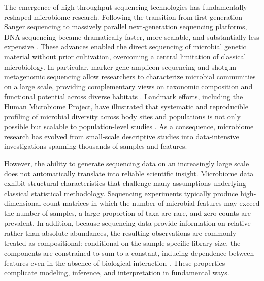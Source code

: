 The emergence of high-throughput sequencing technologies has fundamentally reshaped microbiome research. Following the transition from first-generation Sanger sequencing to massively parallel next-generation sequencing platforms, DNA sequencing became dramatically faster, more scalable, and substantially less expensive \citep{goodwin2016coming,shendure2017dna}. These advances enabled the direct sequencing of microbial genetic material without prior cultivation, overcoming a central limitation of classical microbiology. In particular, marker-gene amplicon sequencing and shotgun metagenomic sequencing allow researchers to characterize microbial communities on a large scale, providing complementary views on taxonomic composition and functional potential across diverse habitats \citep{sharpton2014introduction}.
Landmark efforts, including the Human Microbiome Project, have illustrated that systematic and reproducible profiling of microbial diversity across body sites and populations is not only possible but scalable to population-level studies \citep{hmp2009nihHMP,hmpconsortium2012structure}. As a consequence, microbiome research has evolved from small-scale descriptive studies into data-intensive investigations spanning thousands of samples and features. 

However, the ability to generate sequencing data on an increasingly large scale does not automatically translate into reliable scientific insight. Microbiome data exhibit structural characteristics that challenge many assumptions underlying classical statistical methodology. Sequencing experiments typically produce high-dimensional count matrices in which the number of microbial features may exceed the number of samples, a large proportion of taxa are rare, and zero counts are prevalent. In addition, because sequencing data provide information on relative rather than absolute abundances, the resulting observations are commonly treated as compositional: conditional on the sample-specific library size, the components are constrained to sum to a constant, inducing dependence between features even in the absence of biological interaction \citep{gloor2017microbiome}. These properties complicate modeling, inference, and interpretation in fundamental ways.

